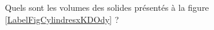 
\begin{exercice}\label{exoSeconde-0089}

Quels sont les volumes des solides présentés à la figure \ref{LabelFigCylindresxKDOdy} ? %
\newcommand{\CaptionFigCylindresxKDOdy}{Quelque solides dont il faut savoir le volume.}


\end{exercice}
